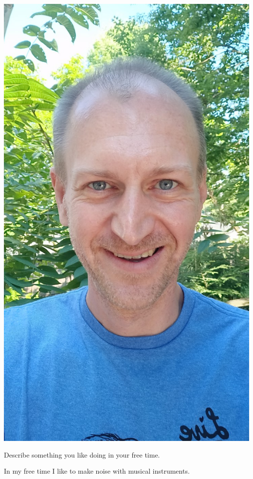 \documentclass[nooutcomes,noauthor,handout]{ximera}
\begin{document}
\begin{question}
\begin{freeResponse}
\begin{center}
      \includegraphics[height=.3\textheight]{me.jpg}
    \end{center}
  \end{freeResponse}
\end{question}
\mynewpage

\begin{question}
  Describe something you like doing in your free time.
  \begin{freeResponse}
    In my free time I like to make noise with musical instruments.
  \end{freeResponse}
\end{question}
\mynewpage
\end{document}
